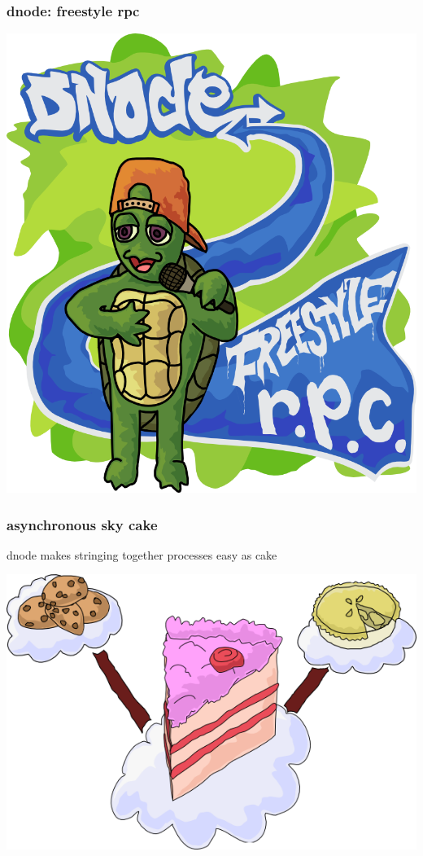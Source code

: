 \documentclass{beamer}
\begin{document}
\begin{frame}

\frametitle{dnode: freestyle rpc}
\begin{center}
\includegraphics[scale=0.3]{images/freestyle_turtle.png}
\end{center}

\end{frame}

\begin{frame}
\begin{center}
\frametitle{asynchronous sky cake}
\huge

dnode makes stringing together processes easy as cake
\newline

\includegraphics[scale=0.5]{images/sky_cake.png}

\end{center}
\end{frame}
\end{document}
